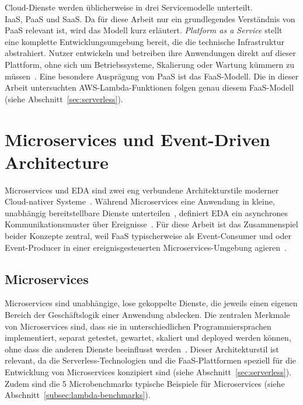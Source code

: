 Cloud-Dienste werden üblicherweise in drei Servicemodelle unterteilt.\\ \ac{IaaS}, \ac{PaaS} und \ac{SaaS}.  
Da für diese Arbeit nur ein grundlegendes Verständnis von \ac{PaaS} relevant ist, wird das Modell kurz erläutert. 
\emph{Platform as a Service} stellt eine komplette Entwicklungsumgebung bereit, die die technische Infrastruktur abstrahiert. 
Nutzer entwickeln und betreiben ihre Anwendungen direkt auf dieser Plattform, ohne sich um Betriebssysteme, Skalierung oder Wartung 
kümmern zu müssen~\cite{Huawei2023CloudComputing}. 
Eine besondere Ausprägung von PaaS ist das \ac{FaaS}-Modell. 
Die in dieser Arbeit untersuchten AWS-Lambda-Funktionen folgen genau diesem FaaS-Modell 
(siehe Abschnitt~\ref{sec:serverless}).

\section{Microservices und Event-Driven Architecture}
\label{sec:microservices-eda}

Microservices und \ac{EDA} sind zwei eng verbundene Architekturstile moderner Cloud-nativer Systeme~\cite{Fowler2024Microservices,Katzer2024Serverless}.  
Während Microservices eine Anwendung in kleine, unabhängig bereitstellbare Dienste unterteilen~\cite{Fowler2024Microservices}, definiert \ac{EDA} ein asynchrones Kommunikationsmuster über Ereignisse~\cite{AWSEventDrivenArchitecture}.  
Für diese Arbeit ist das Zusammenspiel beider Konzepte zentral, weil \ac{FaaS} typischerweise als Event-Consumer und oder Event-Producer in einer ereignisgesteuerten Microservices-Umgebung agieren~\cite{AWSLambdaDocs}.

\subsection{Microservices}
Microservices sind unabhängige, lose gekoppelte Dienste, die jeweils einen eigenen Bereich der Geschäftslogik einer Anwendung abdecken. 
Die zentralen Merkmale von Microservices sind, dass sie in unterschiedlichen Programmiersprachen implementiert, separat getestet, gewartet, skaliert und deployed werden können, ohne
dass die anderen Dienste beeinflusst werden~\cite{Fowler2024Microservices}. Dieser Architekturstil ist relevant, 
da die Serverless-Technologien und die FaaS-Plattformen speziell für die Entwicklung von Microservices konzipiert sind (siehe Abschnitt~\ref{sec:serverless}). 
Zudem sind die 5 Microbenchmarks typische Beispiele für Microservices (siehe Abschnitt~\ref{subsec:lambda-benchmarks}).

